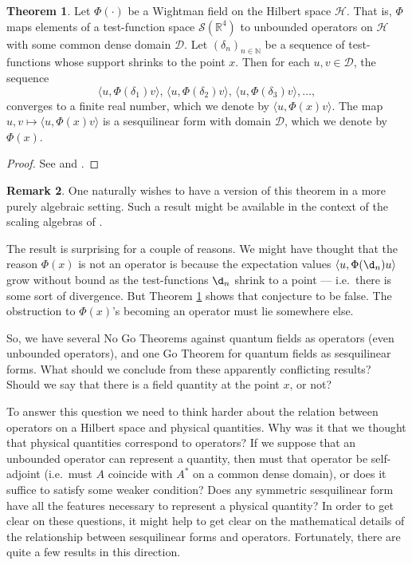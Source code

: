 \documentclass[12pt]{article}
\theoremstyle{definition}
\newtheorem{thm}{Theorem}[section]
\theoremstyle{definition}
\newtheorem{note}[thm]{Remark}
\theoremstyle{remark}
\def\2#1{{\mathcal #1}}
\def\7#1{{\mathbb #1}}
\begin{document}
\begin{thm} Let $\Phi (\cdot )$ be a Wightman field on the Hilbert
  space $\2H$.  That is, $\Phi $ maps elements of a test-function
  space $\2S (\7R ^4)$ to unbounded operators on $\2H$ with some
  common dense domain $\2D$.  Let $(\delta _n)_{n\in \7N}$ be a
  sequence of test-functions whose support shrinks to the point $x$.
  Then for each $u,v\in \2D$, the sequence
  $$ \langle u,\Phi (\delta _1)v\rangle , \, \langle u,\Phi (\delta _2)v\rangle ,\,\langle u,\Phi (\delta _3)v\rangle , \dots ,$$
  converges to a finite real number, which we denote by $\langle
  u,\Phi (x)v\rangle $.  The map $u,v\mapsto \langle u,\Phi
  (x)v\rangle$ is a sesquilinear form with domain $\2D$, which we
  denote by $\Phi (x)$.  \label{russ}
\end{thm}

\begin{proof} See \cite[p.\ 332]{russ} and
  \cite{wollenberg86a,wollenberg86b}.  \end{proof}

\begin{note} One naturally wishes to have a version of this theorem in
  a more purely algebraic setting.  Such a result might be available
  in the context of the scaling algebras of \cite{scaling,bucky}.
\end{note}

The result is surprising for a couple of reasons.  We might have
thought that the reason $\Phi (x)$ is not an operator is because the
expectation values $\langle u,\Phi (\d _n)u\rangle $ grow without
bound as the test-functions $\d _n$ shrink to a point --- i.e.\ there
is some sort of divergence.  But Theorem \ref{russ} shows that
conjecture to be false.  The obstruction to $\Phi (x)$'s becoming an
operator must lie somewhere else.

So, we have several No Go Theorems against quantum fields as operators
(even unbounded operators), and one Go Theorem for quantum fields as
sesquilinear forms.  What should we conclude from these apparently
conflicting results?  Should we say that there is a field quantity at
the point $x$, or not?

To answer this question we need to think harder about the relation
between operators on a Hilbert space and physical quantities.  Why was
it that we thought that physical quantities correspond to operators?
If we suppose that an unbounded operator can represent a quantity,
then must that operator be self-adjoint (i.e.\ must $A$ coincide with
$A^*$ on a common dense domain), or does it suffice to satisfy some
weaker condition?  Does any symmetric sesquilinear form have all the
features necessary to represent a physical quantity?  In order to get
clear on these questions, it might help to get clear on the
mathematical details of the relationship between sesquilinear forms
and operators.  Fortunately, there are quite a few results in this
direction.
\end{document}
